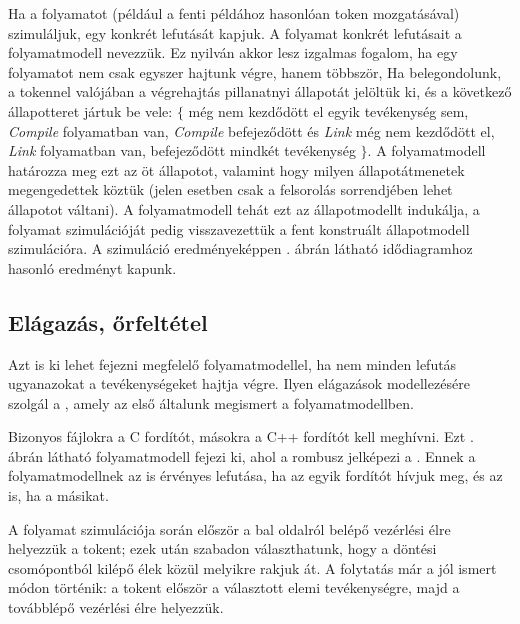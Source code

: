 Ha a folyamatot (például a fenti példához hasonlóan token mozgatásával) szimuláljuk, egy konkrét lefutását kapjuk. A folyamat konkrét lefutásait a folyamatmodell  nevezzük. Ez nyilván akkor lesz izgalmas fogalom, ha egy folyamatot nem csak egyszer hajtunk végre, hanem többször,
Ha belegondolunk, a tokennel valójában a végrehajtás pillanatnyi állapotát jelöltük ki, és a következő állapotteret jártuk be vele: $\{$ még nem kezdődött el egyik tevékenység sem, \emph{Compile} folyamatban van, \emph{Compile} befejeződött és \emph{Link} még nem kezdődött el, \emph{Link} folyamatban van, befejeződött mindkét tevékenység $\}$. A folyamatmodell határozza meg ezt az öt állapotot, valamint hogy milyen állapotátmenetek megengedettek köztük (jelen esetben csak a felsorolás sorrendjében lehet állapotot váltani). A folyamatmodell tehát ezt az állapotmodellt indukálja, a folyamat szimulációját pedig visszavezettük a fent konstruált állapotmodell szimulációra. A szimuláció eredményeképpen . ábrán látható idődiagramhoz hasonló eredményt kapunk.



\subsection{Elágazás, őrfeltétel}
Azt is ki lehet fejezni megfelelő folyamatmodellel, ha nem minden lefutás ugyanazokat a tevékenységeket hajtja végre. Ilyen elágazások modellezésére szolgál a , amely az első általunk megismert  a folyamatmodellben.

\begin{pelda}
Bizonyos fájlokra a C fordítót, másokra a C++ fordítót kell meghívni. Ezt . ábrán látható folyamatmodell fejezi ki, ahol a rombusz jelképezi a . Ennek a folyamatmodellnek az is érvényes lefutása, ha az egyik fordítót hívjuk meg, és az is, ha a másikat.

A folyamat szimulációja során először a bal oldalról belépő vezérlési élre helyezzük a tokent; ezek után szabadon választhatunk, hogy a döntési csomópontból kilépő élek közül melyikre rakjuk át. A folytatás már a jól ismert módon történik: a tokent először a választott elemi tevékenységre, majd a továbblépő vezérlési élre helyezzük. 
\end{pelda}

